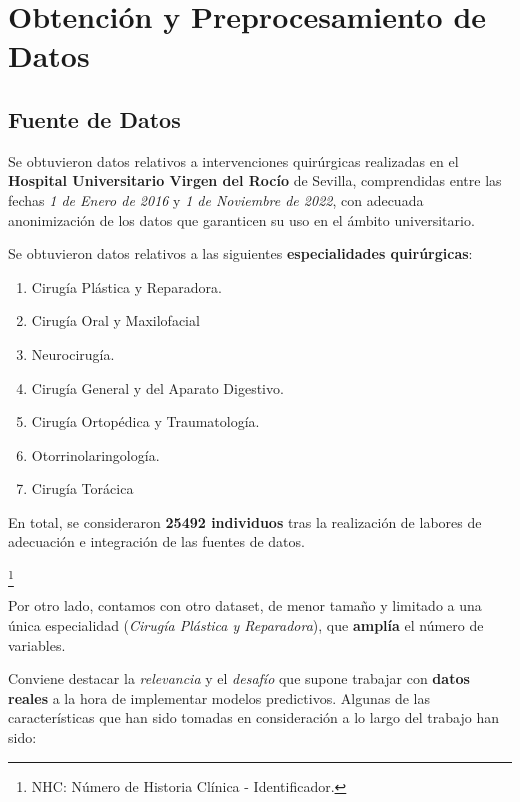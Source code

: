 
\section{Obtención y Preprocesamiento de Datos}

\subsection{Fuente de Datos}

Se obtuvieron datos relativos a intervenciones quirúrgicas realizadas en el \textbf{Hospital Universitario Virgen del Rocío} de Sevilla, comprendidas entre las fechas \textit{1 de Enero de 2016} y \textit{1 de Noviembre de 2022}, con adecuada anonimización de los datos que garanticen su uso en el ámbito universitario.

Se obtuvieron datos relativos a las siguientes \textbf{especialidades quirúrgicas}:
\begin{enumerate}
    \item Cirugía Plástica y Reparadora.
    \item Cirugía Oral y Maxilofacial
    \item Neurocirugía.
    \item Cirugía General y del Aparato Digestivo.
    \item Cirugía Ortopédica y Traumatología.
    \item Otorrinolaringología.
    \item Cirugía Torácica
\end{enumerate}


En total, se consideraron \textbf{25492 individuos} tras la realización de labores de adecuación e integración de las fuentes de datos.

 \footnote{NHC: Número de Historia Clínica - Identificador.}

Por otro lado, contamos con otro dataset, de menor tamaño y limitado a una única especialidad (\textit{Cirugía Plástica y Reparadora}), que \textbf{amplía} el número de variables.
 

Conviene destacar la \textit{relevancia} y el \textit{desafío} que supone trabajar con \textbf{datos reales} a la hora de implementar modelos predictivos.
Algunas de las características que han sido tomadas en consideración a lo largo del trabajo han sido:

